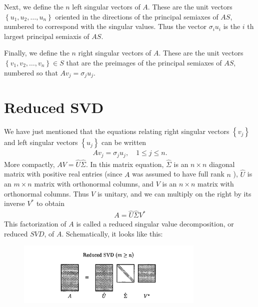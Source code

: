 Next, we define the $n$ left singular vectors of $A$. These are the unit vectors $\left\{u_1, u_2, \ldots, u_n\right\}$ oriented in the directions of the principal semiaxes of $A S$, numbered to correspond with the singular values. Thus the vector $\sigma_i u_i$ is the $i$ th largest principal semiaxis of $A S$.

Finally, we define the $n$ right singular vectors of $A$. These are the unit vectors $\left\{v_1, v_2, \ldots, v_n\right\} \in S$ that are the preimages of the principal semiaxes of $A S$, numbered so that $A v_j=\sigma_j u_j$.

\section{Reduced SVD} 
We have just mentioned that the equations relating right singular vectors $\left\{v_j\right\}$ and left singular vectors $\left\{u_j\right\}$ can be written
\begin{align*}
A v_j=\sigma_j u_j, \quad 1 \leq j \leq n. 
\end{align*}
More compactly, $A V=\hat{U} \hat{\Sigma}$. In this matrix equation, $\hat{\Sigma}$ is an $n \times n$ diagonal matrix with positive real entries (since $A$ was assumed to have full rank $n$ ), $\hat{U}$ is an $m \times n$ matrix with orthonormal columns, and $V$ is an $n \times n$ matrix with orthonormal columns. Thus $V$ is unitary, and we can multiply on the right by its inverse $V^*$ to obtain
\begin{align*}
A=\hat{U} \hat{\Sigma} V^*
\end{align*}
This factorization of $A$ is called a reduced singular value decomposition, or reduced $S V D$, of $A$. Schematically, it looks like this:
\begin{figure}[H]
    \centering
    \includegraphics[width=0.8\textwidth]{figures/4-2.png}
\end{figure}

